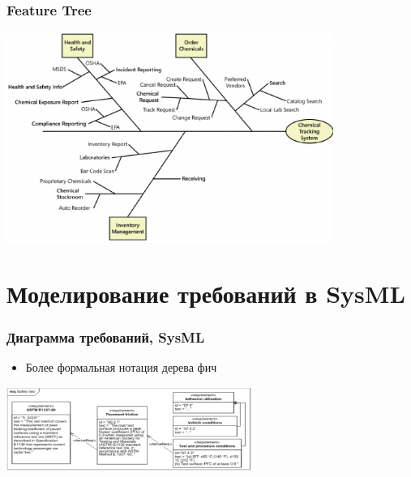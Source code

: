 \documentclass{../../slides-style}
\begin{document}
    \begin{frame}
        \frametitle{Feature Tree}
        \begin{center}
            \includegraphics[width=0.8\textwidth]{featureTree.png}
        \end{center}
    \end{frame}

    \section{Моделирование требований в SysML}

    \begin{frame}
        \frametitle{Диаграмма требований, SysML}
        \begin{itemize}
            \item Более формальная нотация дерева фич
        \end{itemize}
        \begin{center}
            \includegraphics[width=0.6\textwidth]{sysMlRequirementDiagram.png}
        \end{center}
    \end{frame}
\end{document}
